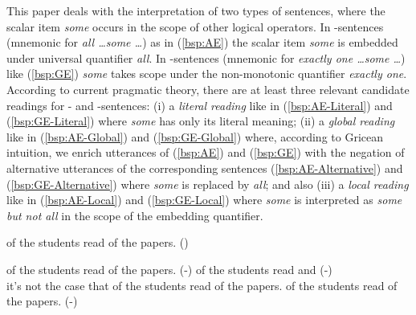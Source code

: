 \documentclass[fleqn,reqno,10pt,draft]{article}
\newcommand{\lit}{\acro{lit}}
\newcommand{\glb}{\acro{glb}}
\newcommand{\loc}{\acro{loc}}
\newcommand{\as}{\acro{as}}
\renewcommand{\es}{\acro{es}}
\begin{document}


This paper deals with the interpretation of two types of sentences,
where the scalar item \emph{some} occurs in the scope of other logical
operators. In \as-sentences (mnemonic for \textit{all \dots some \dots})
as in (\ref{bsp:AE}) the scalar item \emph{some} is embedded under
universal quantifier \emph{all}. In \es-sentences (mnemonic for
\textit{exactly one \dots some \dots}) like (\ref{bsp:GE}) \emph{some}
takes scope under the non-monotonic quantifier \emph{exactly one}.
According to current pragmatic theory, there are at least three
relevant candidate readings for \as- and \es-sentences: (i) a
\emph{literal reading} like in (\ref{bsp:AE-Literal}) and
(\ref{bsp:GE-Literal}) where \emph{some} has only its literal meaning;
(ii) a \emph{global reading} like in (\ref{bsp:AE-Global}) and
(\ref{bsp:GE-Global}) where, according to Gricean intuition, we enrich
utterances of (\ref{bsp:AE}) and (\ref{bsp:GE}) with the negation of
alternative utterances of the corresponding sentences
(\ref{bsp:AE-Alternative}) and (\ref{bsp:GE-Alternative}) where
\emph{some} is replaced by \emph{all}; and also (iii) a \emph{local
  reading} like in (\ref{bsp:AE-Local}) and (\ref{bsp:GE-Local}) where
\emph{some} is interpreted as \emph{some but not all} in the scope of
the embedding quantifier.


\begin{exe}
  \ex \label{bsp:AE}  of the students read {} of the
  papers. \hfill{(\as)}

  \begin{xlist}
  \ex \label{bsp:AE-Literal}  of the students read
    {} of the papers. \hfill (\as-\lit)
  \ex \label{bsp:AE-Global}
     of the students read  
    and  \hfill (\as-\glb)\\
    it's not the case that  of the students read  of the papers.
  \ex \label{bsp:AE-Local}
     of the students read {} of the
    papers. \hfill (\as-\loc)
  \end{xlist}
\end{exe}
\end{document}

